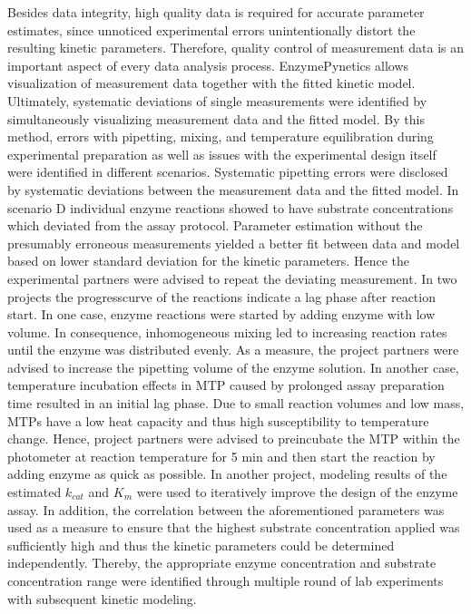 \documentclass[letterpaper,12pt,english]{jupyterBook}
\begin{document}
\sphinxAtStartPar
Besides data integrity, high quality data is required for accurate parameter estimates, since unnoticed experimental errors unintentionally distort the resulting kinetic parameters. Therefore, quality control of measurement data is an important aspect of every data analysis process. EnzymePynetics allows visualization of measurement data together with the fitted kinetic model. Ultimately, systematic deviations of single measurements were identified by simultaneously visualizing measurement data and the fitted model.
By this method, errors with pipetting, mixing, and temperature equilibration during experimental preparation as well as issues with the experimental design itself were identified in different scenarios. Systematic pipetting errors were disclosed by systematic deviations between the measurement data and the fitted model.
In scenario D individual enzyme reactions showed to have substrate concentrations which deviated from the assay protocol. Parameter estimation without the presumably erroneous measurements yielded a better fit between data and model based on lower standard deviation for the kinetic parameters. Hence the experimental partners were advised to repeat the deviating measurement. In two projects the progress\sphinxhyphen{}curve of the reactions indicate a lag phase after reaction start. In one case, enzyme reactions were started by adding enzyme with low volume. In consequence, inhomogeneous mixing led to increasing reaction rates until the enzyme was distributed evenly. As a measure, the project partners were advised to increase the pipetting volume of the enzyme solution.
In another case, temperature incubation effects in MTP caused by prolonged assay preparation time resulted in an initial lag phase. Due to small reaction volumes and low mass, MTPs have a low heat capacity and thus high susceptibility to temperature change. Hence, project partners were advised to pre\sphinxhyphen{}incubate the MTP within the photometer at reaction temperature for 5 min and then start the reaction by adding enzyme as quick as possible.
In another project, modeling results of the estimated \(k_{cat}\) and \(K_{m}\) were used to iteratively improve the design of the enzyme assay. In addition, the correlation between the aforementioned parameters was used as a measure to ensure that the highest substrate concentration applied was sufficiently high and thus the kinetic parameters could be determined independently.
Thereby, the appropriate enzyme concentration and substrate concentration range were identified through multiple round of lab experiments with subsequent kinetic modeling.
\end{document}
